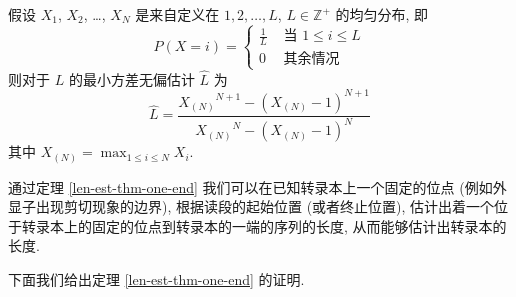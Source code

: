 \begin{thm}
\label{len-est-thm-one-end}
假设 $X_1$, $X_2$, \ldots, $X_N$ 是来自定义在 
${1, 2, \ldots , L}$, $L \in \mathbb{Z}^+$ 的均匀分布, 
即 
\[
P(X = i) =  \begin{cases}
\frac{1}{L} & \text{ 当 } 1 \leq i \leq L \\
0 & \text{ 其余情况 }
\end{cases}
\]
则对于 $L$ 的最小方差无偏估计 $\hat{L}$ 为
\begin{equation}
\label{len-est-thm-on-end-eq}
\hat{L} = \frac{ {X_{(N)}}^{N+1} - (X_{(N)} - 1)^{N+1} }{ {X_{(N)}}^N - (X_{(N)} - 1)^N }
\end{equation}
其中 $X_{(N)} = \max_{1 \leq i \leq N} X_i$. 
\end{thm}

通过定理 \ref{len-est-thm-one-end} 我们可以在已知转录本上一个固定的位点 
(例如外显子出现剪切现象的边界), 根据读段的起始位置 (或者终止位置), 
估计出着一个位于转录本上的固定的位点到转录本的一端的序列的长度, 
从而能够估计出转录本的长度. 

下面我们给出定理 \ref{len-est-thm-one-end} 的证明. 


